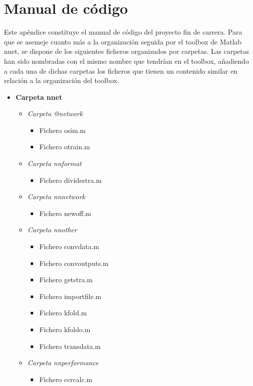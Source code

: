 \chapter{Manual de código}
	
	Este apéndice constituye el manual de código del proyecto fin de carrera. Para que se asemeje cuanto más a la organización seguida por el toolbox de Matlab nnet, se dispone de los siguientes ficheros organizados por carpetas. Las carpetas han sido nombradas con el mismo nombre que tendrían en el toolbox, añadiendo a cada una de dichas carpetas los ficheros que tienen un contenido similar en relación a la organización del toolbox.
	
	\begin{itemize}
		\item \textbf{Carpeta nnet}
		\begin{itemize}
			\item \textit{Carpeta @network}
			\begin{itemize}
				\item Fichero osim.m
				\item Fichero otrain.m
			\end{itemize}
			\item \textit{Carpeta nnformat}
			\begin{itemize}
				\item Fichero dividestra.m
			\end{itemize}
			\item \textit{Carpeta nnnetwork}
			\begin{itemize}
				\item Fichero newoff.m
			\end{itemize}
			\item \textit{Carpeta nnother}
			\begin{itemize}
				\item Fichero convdata.m
				\item Fichero convoutputs.m
				\item Fichero getstra.m
				\item Fichero importfile.m
				\item Fichero kfold.m
				\item Fichero kfoldo.m
				\item Fichero transdata.m
			\end{itemize}
			\item \textit{Carpeta nnperformance}
			\begin{itemize}
				\item Fichero ccrcalc.m

\end{itemize}
\end{itemize}
\end{itemize}

